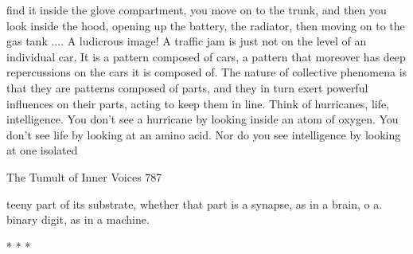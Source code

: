 find it inside the glove compartment, you move on to the trunk, and then you look
inside the hood, opening up the battery, the radiator, then moving on to the gas tank
.... A ludicrous image! A traffic jam is just not on the level of an individual car. It is a
pattern composed of cars, a pattern that moreover has deep repercussions on the cars
it is composed of.
         The nature of collective phenomena is that they are patterns composed of
parts, and they in turn exert powerful influences on their parts, acting to keep them in
line. Think of hurricanes, life, intelligence. You don't see a hurricane by looking
inside an atom of oxygen. You don't see life by looking at an amino acid. Nor do you
see intelligence by looking at one isolated




The Tumult of Inner Voices                                                             787

teeny part of its substrate, whether that part is a synapse, as in a brain, o a. binary
digit, as in a machine.

*   *   *

